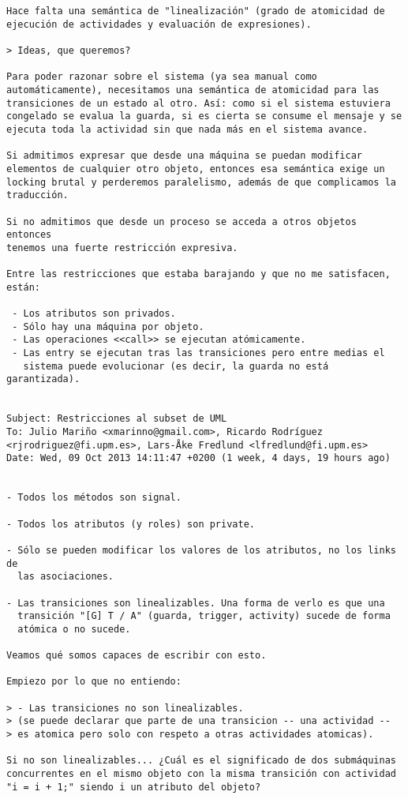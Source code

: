 \begin{verbatim}
Hace falta una semántica de "linealización" (grado de atomicidad de
ejecución de actividades y evaluación de expresiones).

> Ideas, que queremos?

Para poder razonar sobre el sistema (ya sea manual como
automáticamente), necesitamos una semántica de atomicidad para las
transiciones de un estado al otro. Así: como si el sistema estuviera
congelado se evalua la guarda, si es cierta se consume el mensaje y se
ejecuta toda la actividad sin que nada más en el sistema avance.

Si admitimos expresar que desde una máquina se puedan modificar
elementos de cualquier otro objeto, entonces esa semántica exige un
locking brutal y perderemos paralelismo, además de que complicamos la
traducción.

Si no admitimos que desde un proceso se acceda a otros objetos entonces
tenemos una fuerte restricción expresiva.

Entre las restricciones que estaba barajando y que no me satisfacen,
están:

 - Los atributos son privados.
 - Sólo hay una máquina por objeto.
 - Las operaciones <<call>> se ejecutan atómicamente.
 - Las entry se ejecutan tras las transiciones pero entre medias el
   sistema puede evolucionar (es decir, la guarda no está garantizada).


Subject: Restricciones al subset de UML
To: Julio Mariño <xmarinno@gmail.com>, Ricardo Rodríguez <rjrodriguez@fi.upm.es>, Lars-Åke Fredlund <lfredlund@fi.upm.es>
Date: Wed, 09 Oct 2013 14:11:47 +0200 (1 week, 4 days, 19 hours ago)


- Todos los métodos son signal.

- Todos los atributos (y roles) son private.

- Sólo se pueden modificar los valores de los atributos, no los links de
  las asociaciones.

- Las transiciones son linealizables. Una forma de verlo es que una
  transición "[G] T / A" (guarda, trigger, activity) sucede de forma
  atómica o no sucede.

Veamos qué somos capaces de escribir con esto.

Empiezo por lo que no entiendo:

> - Las transiciones no son linealizables.
> (se puede declarar que parte de una transicion -- una actividad --
> es atomica pero solo con respeto a otras actividades atomicas).

Si no son linealizables... ¿Cuál es el significado de dos submáquinas
concurrentes en el mismo objeto con la misma transición con actividad
"i = i + 1;" siendo i un atributo del objeto?


\end{verbatim}
